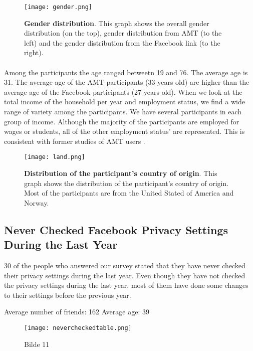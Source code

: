 \begin{figure}[h!]
\centering
\texttt{[image: gender.png]}
\caption[Gender distribution]{\textbf{Gender distribution}. This graph shows the overall gender distribution (on the top), gender distribution from AMT (to the left) and the gender distribution from the Facebook link (to the right).} 
\label{fig:gender}
\end{figure}

\paragraph{}
Among the participants the age ranged betweetn 19 and 76. The average age is 31. The average age of the AMT participants (33 years old) are higher than the average age of the Facebook participants (27 years old). When we look at the total income of the household per year and employment status, we find a wide range of variety among the participants. We have several participants in each group of income. Although the majority of the participants are employed for wages or students, all of the other employment status' are represented. This is consistent with former studies of AMT users \cite{incentivesAmt}. 

\begin{figure}[h!]
\centering
\texttt{[image: land.png]}
\caption[Distribution of the participant's country of origin]{\textbf{Distribution of the participant's country of origin}. This graph shows the distribution of the participant's country of origin. Most of the participants are from the United Stated of America and Norway.} 
\label{fig:land}
\end{figure}

\subsection{Never Checked Facebook Privacy Settings During the Last Year}
30 of the people who answered our survey stated that they have never checked their privacy settings during the last year. Even though they have not checked the privacy settings during the last year, most of them have done some changes to their settings before the previous year. 

Average number of friends: 162
Average age: 39

\begin{figure}[h!]
\centering
\texttt{[image: nevercheckedtable.png]}
\caption[Bilde 1]{Bilde 11} 
\label{fig:co}
\end{figure}

